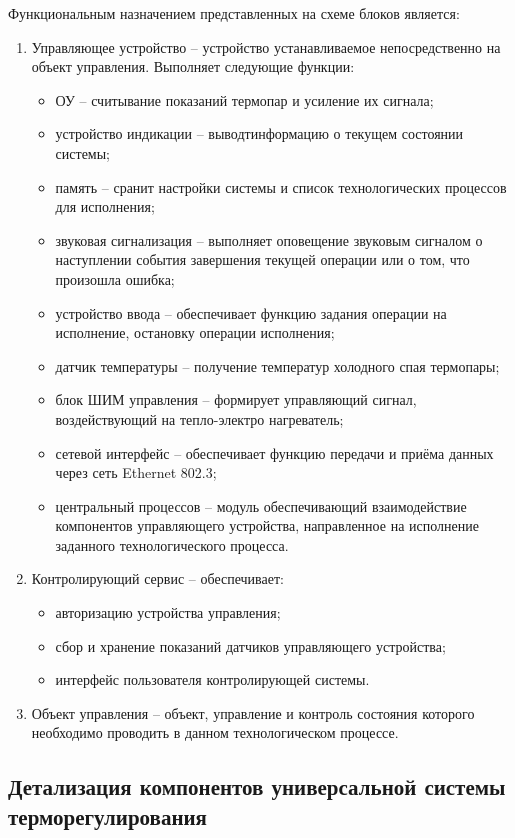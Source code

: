 Функциональным назначением представленных на схеме блоков является:
\begin{enumerate}
	\item{} Управляющее устройство -- устройство устанавливаемое непосредственно
	на объект управления. Выполняет следующие функции:
		\begin{itemize}
			\item{} ОУ -- считывание показаний термопар и усиление их сигнала;
			\item{} устройство индикации -- выводтинформацию о текущем состоянии системы;
			\item{} память -- сранит настройки системы и список технологических процессов для
				исполнения;
			\item{} звуковая сигнализация -- выполняет оповещение звуковым сигналом о
				наступлении события завершения текущей операции или о том, что произошла ошибка;
			\item{} устройство ввода -- обеспечивает функцию задания операции на исполнение,
				остановку операции исполнения;
			\item{} датчик температуры -- получение температур холодного спая термопары;
			\item{} блок ШИМ управления -- формирует управляющий сигнал, воздействующий на
				тепло-электро нагреватель;
			\item{} сетевой интерфейс -- обеспечивает функцию передачи и приёма данных
				через сеть Ethernet 802.3;
			\item{} центральный процессов -- модуль обеспечивающий взаимодействие компонентов
				управляющего устройства, направленное на исполнение заданного технологического
				процесса.
		\end{itemize}
	\item{} Контролирующий сервис -- обеспечивает:
	 	\begin{itemize}
			\item{} авторизацию устройства управления;
			\item{} сбор и хранение показаний датчиков управляющего устройства;
			\item{} интерфейс пользователя контролирующей системы.
		\end{itemize}
	\item{} Объект управления -- объект, управление и контроль состояния которого необходимо проводить
		в данном технологическом процессе.
\end{enumerate}

\subsection{Детализация компонентов универсальной системы терморегулирования}


